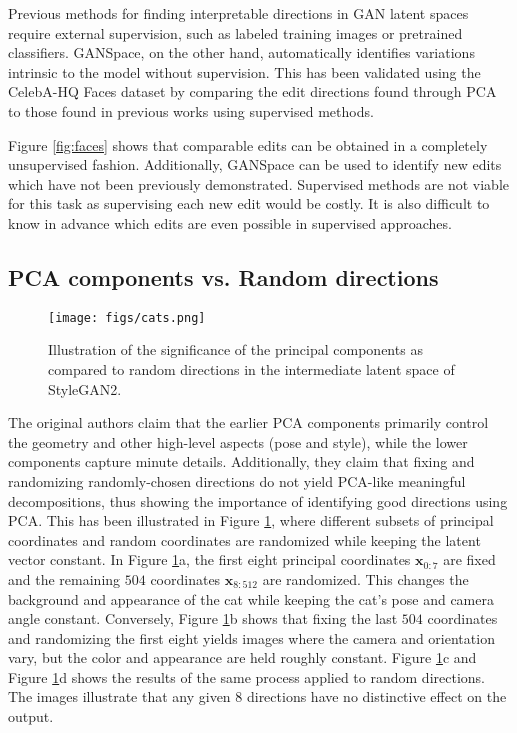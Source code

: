 Previous methods for finding interpretable directions in GAN latent spaces require external supervision, such as labeled training images or pretrained classifiers. GANSpace, on the other hand, automatically identifies variations intrinsic to the model without supervision. This has been validated using the CelebA-HQ Faces dataset by comparing the edit directions found through PCA to those found in previous works using supervised methods.

Figure \ref{fig:faces} shows that comparable edits can be obtained in a completely unsupervised fashion. Additionally, GANSpace can be used to identify new edits which have not been previously demonstrated. Supervised methods are not viable for this task as supervising each new edit would be costly. It is also difficult to know in advance which edits are even possible in supervised approaches.

\subsection{PCA components vs. Random directions}

\begin{figure}[H]
    \centering
    \texttt{[image: figs/cats.png]}
    \caption{Illustration of the significance of the principal components as compared to random directions in the intermediate latent space of StyleGAN2.}
    \label{fig:cats}
\end{figure}

The original authors claim that the earlier PCA components primarily control the geometry and other high-level aspects (pose and style), while the lower components capture minute details. Additionally, they claim that fixing and randomizing randomly-chosen directions do not yield PCA-like meaningful decompositions, thus showing the importance of identifying good directions using PCA. This has been illustrated in Figure \ref{fig:cats}, where different subsets of principal coordinates and random coordinates are randomized while keeping the latent vector constant. In Figure \ref{fig:cats}a, the first eight principal coordinates $\mathbf{x}_{0:7}$ are fixed and the remaining $504$ coordinates $\mathbf{x}_{8:512}$ are randomized. This changes the background and appearance of the cat while keeping the cat's pose and camera angle constant. Conversely, Figure \ref{fig:cats}b shows that fixing the last $504$ coordinates and randomizing the first eight yields images where the camera and orientation vary, but the color and appearance are held roughly constant. Figure \ref{fig:cats}c and Figure \ref{fig:cats}d shows the results of the same process applied to random directions. The images illustrate that any given $8$ directions have no distinctive effect on the output.

